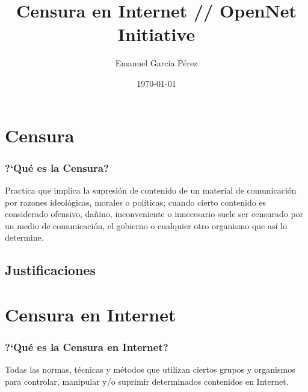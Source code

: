 \documentclass{beamer}
\title{\textbf{Censura en Internet // OpenNet Initiative}}
\author{Emanuel Garc\'ia P\'erez}
\date{\today}
\begin{document}
\frame[allowframebreaks]{\titlepage}
\section[Contenidos]{}
\frame{
\transdissolve[duration=0.2]
\tableofcontents
}


\section{Censura}
\frame
{
\transdissolve[duration=0.2]
\frametitle{?`Qu\'e es la Censura?}
Practica que implica la supresi\'on de contenido de un material de comunicaci\'on por razones ideol\'ogicas, morales o pol\'iticas; cuando cierto contenido es considerado ofensivo, da\~nino, inconveniente o innecesario suele ser censurado por un medio de comunicaci\'on, el gobierno o cualquier otro organismo que as\'i lo determine.
}

\subsection{Justificaciones}






\section{Censura en Internet}
\frame
{
\transdissolve[duration=0.2]
\frametitle{?`Qu\'e es la Censura en Internet?}
Todas las normas, t\'ecnicas y m\'etodos que utilizan ciertos grupos y organismos para controlar, manipular y/o suprimir determinados contenidos en Internet.
}
\end{document}
